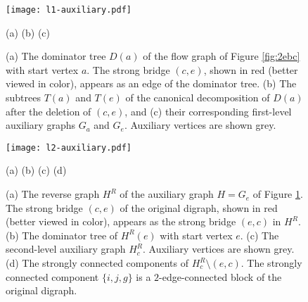 \documentclass[11pt]{article}
\begin{document}
\begin{figure}[t!]
\begin{center}
\texttt{[image: l1-auxiliary.pdf]}
\end{center}
\vspace{-0.2cm}
\hspace{2.8cm} (a) \hspace{3.9cm} (b) \hspace{4.8cm} (c)
\caption{(a) The dominator tree $D(a)$ of the flow graph of Figure \ref{fig:2ebc} with start vertex $a$. The strong bridge $(c,e)$, shown in red (better viewed in color), appears as an edge of the dominator tree. (b) The subtrees $T(a)$ and $T(e)$ of the canonical decomposition of $D(a)$ after the deletion of $(c,e)$, and (c) their corresponding first-level auxiliary graphs $G_a$ and $G_e$. Auxiliary vertices are shown grey.
}
\label{fig:l1-auxiliary}
\end{figure}
\begin{figure}[h!]
\begin{center}
\texttt{[image: l2-auxiliary.pdf]}
\end{center}
\vspace{-0.5cm}
\hspace{1.5cm} (a) \hspace{3cm} (b) \hspace{3.1cm} (c) \hspace{4.1cm} (d)
\caption{(a) The reverse graph $H^R$ of the auxiliary graph $H=G_e$ of Figure \ref{fig:l1-auxiliary}. The strong bridge $(c,e)$ of the original digraph, shown in red (better viewed in color), appears as the strong bridge $(e,c)$ in $H^R$. (b) The dominator tree of $H^R(e)$ with start vertex $e$. (c) The second-level auxiliary graph $H^R_c$. Auxiliary vertices are shown grey. (d) The strongly connected components of $H^R_c \setminus (e,c)$.
The strongly connected component $\{i,j,g\}$ is a $2$-edge-connected block of the original digraph.
}
\label{fig:l2-auxiliary}
\end{figure}
\end{document}
